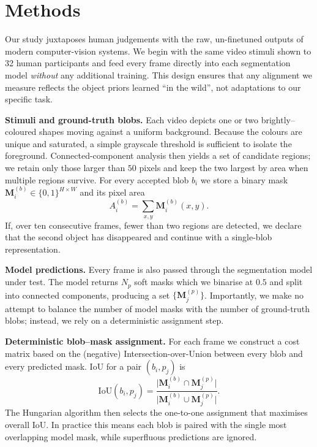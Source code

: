 \documentclass[letterpaper]{article} %
\begin{document}
\section{Methods}

Our study juxtaposes human judgements with the raw, un-finetuned outputs of modern computer-vision systems.  We begin with the same video stimuli shown to 32 human participants and feed every frame directly into each segmentation model \emph{without} any additional training.  This design ensures that any alignment we measure reflects the object priors learned ``in the wild'', not adaptations to our specific task.

\textbf{Stimuli and ground-truth blobs.}  Each video depicts one or two brightly–coloured shapes moving against a uniform background.  Because the colours are unique and saturated, a simple grayscale threshold is sufficient to isolate the foreground.  Connected-component analysis then yields a set of candidate regions; we retain only those larger than $50$ pixels and keep the two largest by area when multiple regions survive.  For every accepted blob $b_i$ we store a binary mask $\mathbf{M}^{(b)}_i \in \{0,1\}^{H\times W}$ and its pixel area
\begin{equation}
A^{(b)}_i = \sum_{x,y} \mathbf{M}^{(b)}_i(x,y).
\label{eq:area}
\end{equation}
If, over ten consecutive frames, fewer than two regions are detected, we declare that the second object has disappeared and continue with a single-blob representation.

\textbf{Model predictions.}  Every frame is also passed through the segmentation model under test.  The model returns $N_p$ soft masks which we binarise at $0.5$ and split into connected components, producing a set $\{\mathbf{M}^{(p)}_j\}$.  Importantly, we make no attempt to balance the number of model masks with the number of ground-truth blobs; instead, we rely on a deterministic assignment step.

\textbf{Deterministic blob–mask assignment.}  For each frame we construct a cost matrix based on the (negative) Intersection-over-Union between every blob and every predicted mask.  IoU for a pair $(b_i, p_j)$ is
\begin{equation}
\text{IoU}(b_i,p_j) = \frac{\lvert \mathbf{M}^{(b)}_i \cap \mathbf{M}^{(p)}_j \rvert}{\lvert \mathbf{M}^{(b)}_i \cup \mathbf{M}^{(p)}_j \rvert}.
\label{eq:iou}
\end{equation}
The Hungarian algorithm then selects the one-to-one assignment that maximises overall IoU.  In practice this means each blob is paired with the single most overlapping model mask, while superfluous predictions are ignored.
\end{document}
